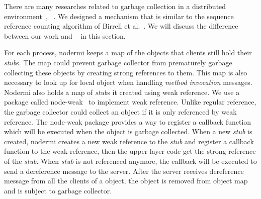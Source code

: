 There are many researches related to garbage collection in a distributed
environment~\cite{abdullahi1998garbage}, ~\cite{birrell1993distributed}.
We designed a mechanism that is similar to the sequence reference counting algorithm 
of Birrell et al.~\cite{birrell1993distributed}.
We will discuss the difference between our work and ~\cite{birrell1993distributed}
in this section.

For each process, nodermi keeps a map of the objects that clients still hold
their \emph{stub}s. 
The map could prevent garbage collector from prematurely garbage collecting
these objects by creating strong references to them.
This map is also necessary to look up for local object when handling \emph{method invocation} messages.
Nodermi also holds a map of \emph{stub}s it created using weak reference.
We use a \nodejs{} package called node-weak~\cite{nodeweak} to implement weak reference.
Unlike regular reference, the garbage collector could collect an object if it is only
referenced by weak reference.
The node-weak package provides a way to register a callback function which will
be executed when the object is garbage collected.
When a new \emph{stub} is created, nodermi creates a new weak reference to 
the \emph{stub} and register a callback function to the weak reference,
then the upper layer code get the strong reference of the \emph{stub}.
When \emph{stub} is not referenced anymore, 
the callback will be executed to send a dereference message to the server.
After the server receives dereference message from all the clients of a object,
the object is removed from object map and is subject to garbage collector.


\nodrmiobjmapfig{}


